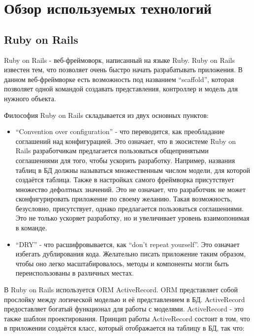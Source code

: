 \lstset{style=fsharpstyle}

\section{Обзор используемых технологий}
\label{sec:technologies}

\subsection{Ruby on Rails}
\label{sub:technologies:ruby_on_rails}
Ruby on Rails - веб-фреймоворк, написанный на языке Ruby. Ruby on Rails известен тем, что позволяет очень быстро начать разрабатывать приложения. В данном веб-фреймворке есть возможность под названием ``scaffold'', которая позволяет одной командой создавать представления, контроллер и модель для нужного объекта.

Философия Ruby on Rails складывается из двух основных пунктов:

\begin{itemize}
  \item ``Convention over configuration'' - что переводится, как преобладание соглашений над конфигурацией. Это означает, что в экосистеме Ruby on Rails разработчикам предлагается пользоваться общепринятыми соглашениями для того, чтобы ускорить разработку. Например, названия таблиц в БД должны называться множественным числом модели, для которой создаётся таблица. Также в настройках самого фреймворка присутствует множество дефолтных значений. Это не означает, что разработчик не может сконфигурировать приложение по своему желанию. Такая возможность, безусловно, присутствует, однако предлагается пользоваться соглашениями. Это не только ускоряет разработку, но и увеличивает уровень взаимопонимая в команде.
  \item ``DRY'' - что расшифровывается, как ``don't repeat yourself''. Это означает избегать дублирования кода. Желательно писать приложение таким образом, чтобы оно легко масштабировалось, методы и компоненты могли быть переиспользованы в различных местах.
\end{itemize}

В Ruby on Rails используется ORM ActiveRecord. ORM представляет собой прослойку между логической моделью и её представлением в БД. ActiveRecord предоставляет богатый функционал для работы с моделями. ActiveRecord - это также шаблон проектирования. Принцип работы ActiveRecord состоит в том, что в приложении создаётся класс, который отображается на таблицу в БД, так что:

